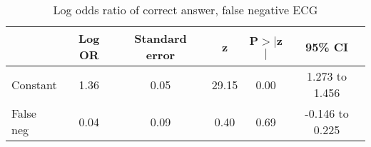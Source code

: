 \begin{table}[htbp]
\centering
\caption{Log odds ratio of correct answer, false negative ECG} 
\label{lormesg}
\begin{tabular}{lccccc}
  \toprule
 & Log OR & Standard error & z & P$>$$|$z$|$ & 95\% CI \\ 
  \midrule
Constant & 1.36 & 0.05 & 29.15 & 0.00 & 1.273 to 1.456 \\ 
  False neg & 0.04 & 0.09 & 0.40 & 0.69 & -0.146 to 0.225 \\ 
   \bottomrule
\end{tabular}
\end{table}
